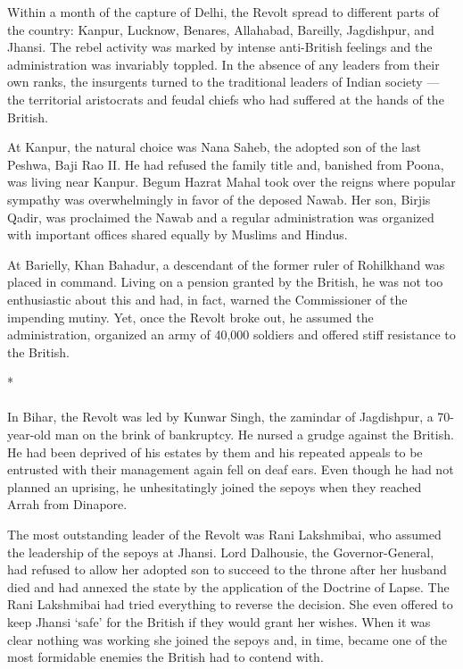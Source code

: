 Within a month of the capture of Delhi, the Revolt spread to different parts of the country: Kanpur, Lucknow, Benares, Allahabad, Bareilly, Jagdishpur, and Jhansi. The rebel activity was marked by intense anti-British feelings and the administration was invariably toppled. In the absence of any leaders from their own ranks, the insurgents turned to the traditional leaders of Indian society --- the territorial aristocrats and feudal chiefs who had suffered at the hands of the British.

At Kanpur, the natural choice was Nana Saheb, the adopted son of the last Peshwa, Baji Rao II. He had refused the family title and, banished from Poona, was living near Kanpur. Begum Hazrat Mahal took over the reigns where popular sympathy was overwhelmingly in favor of the deposed Nawab. Her son, Birjis Qadir, was proclaimed the Nawab and a regular administration was organized with important offices shared equally by Muslims and Hindus.

At Barielly, Khan Bahadur, a descendant of the former ruler of Rohilkhand was placed in command. Living on a pension granted by the British, he was not too enthusiastic about this and had, in fact, warned the Commissioner of the impending mutiny. Yet, once the Revolt broke out, he assumed the administration, organized an army of 40,000 soldiers and offered stiff resistance to the British.

\begin{center}*\end{center}

\paragraph*{}
In Bihar, the Revolt was led by Kunwar Singh, the zamindar of Jagdishpur, a 70-year-old man on the brink of bankruptcy. He nursed a grudge against the British. He had been deprived of his estates by them and his repeated appeals to be entrusted with their management again fell on deaf ears. Even though he had not planned an uprising, he unhesitatingly joined the sepoys when they reached Arrah from Dinapore.

The most outstanding leader of the Revolt was Rani Lakshmibai, who assumed the leadership of the sepoys at Jhansi. Lord Dalhousie, the Governor-General, had refused to allow her adopted son to succeed to the throne after her husband died and had annexed the state by the application of the Doctrine of Lapse. The Rani Lakshmibai had tried everything to reverse the decision. She even offered to keep Jhansi `safe' for the British if they would grant her wishes. When it was clear nothing was working she joined the sepoys and, in time, became one of the most formidable enemies the British had to contend with.

